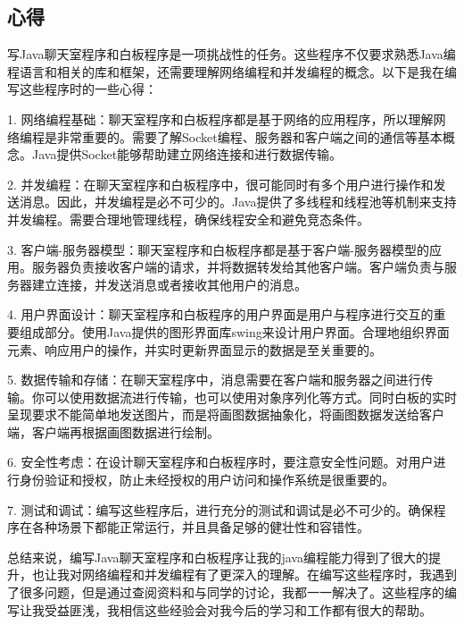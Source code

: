 \documentclass[UTF8,12pt]{article}
\begin{document}
\subsection{心得}
写Java聊天室程序和白板程序是一项挑战性的任务。这些程序不仅要求熟悉Java编程语言和相关的库和框架，还需要理解网络编程和并发编程的概念。以下是我在编写这些程序时的一些心得：

1. 网络编程基础：聊天室程序和白板程序都是基于网络的应用程序，所以理解网络编程是非常重要的。需要了解Socket编程、服务器和客户端之间的通信等基本概念。Java提供Socket能够帮助建立网络连接和进行数据传输。

2. 并发编程：在聊天室程序和白板程序中，很可能同时有多个用户进行操作和发送消息。因此，并发编程是必不可少的。Java提供了多线程和线程池等机制来支持并发编程。需要合理地管理线程，确保线程安全和避免竞态条件。

3. 客户端-服务器模型：聊天室程序和白板程序都是基于客户端-服务器模型的应用。服务器负责接收客户端的请求，并将数据转发给其他客户端。客户端负责与服务器建立连接，并发送消息或者接收其他用户的消息。

4. 用户界面设计：聊天室程序和白板程序的用户界面是用户与程序进行交互的重要组成部分。使用Java提供的图形界面库swing来设计用户界面。合理地组织界面元素、响应用户的操作，并实时更新界面显示的数据是至关重要的。

5. 数据传输和存储：在聊天室程序中，消息需要在客户端和服务器之间进行传输。你可以使用数据流进行传输，也可以使用对象序列化等方式。同时白板的实时呈现要求不能简单地发送图片，而是将画图数据抽象化，将画图数据发送给客户端，客户端再根据画图数据进行绘制。

6. 安全性考虑：在设计聊天室程序和白板程序时，要注意安全性问题。对用户进行身份验证和授权，防止未经授权的用户访问和操作系统是很重要的。

7. 测试和调试：编写这些程序后，进行充分的测试和调试是必不可少的。确保程序在各种场景下都能正常运行，并且具备足够的健壮性和容错性。

总结来说，编写Java聊天室程序和白板程序让我的java编程能力得到了很大的提升，也让我对网络编程和并发编程有了更深入的理解。在编写这些程序时，我遇到了很多问题，但是通过查阅资料和与同学的讨论，我都一一解决了。这些程序的编写让我受益匪浅，我相信这些经验会对我今后的学习和工作都有很大的帮助。
\end{document}
